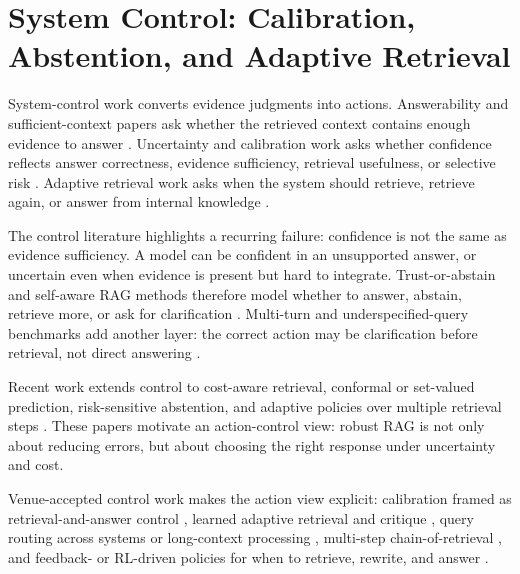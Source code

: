 \section{System Control: Calibration, Abstention, and Adaptive Retrieval}

System-control work converts evidence judgments into actions. Answerability and sufficient-context papers ask whether the retrieved context contains enough evidence to answer \citep{sufficientContext2024,rrag111,rrag141,rrag193}. Uncertainty and calibration work asks whether confidence reflects answer correctness, evidence sufficiency, retrieval usefulness, or selective risk \citep{calibRAG2025,uncertaintyRAG2024,rrag001,rrag007,rrag012,rrag093}. Adaptive retrieval work asks when the system should retrieve, retrieve again, or answer from internal knowledge \citep{selfRAG2023,whenToRetrieve2024,crag2024,ctrla2025,rrag034}.

The control literature highlights a recurring failure: confidence is not the same as evidence sufficiency. A model can be confident in an unsupported answer, or uncertain even when evidence is present but hard to integrate. Trust-or-abstain and self-aware RAG methods therefore model whether to answer, abstain, retrieve more, or ask for clarification \citep{rrag002,rrag006,rrag041,rrag064,rrag066,rrag074,rrag075,rrag087,rrag095,rrag105,rrag108}. Multi-turn and underspecified-query benchmarks add another layer: the correct action may be clarification before retrieval, not direct answering \citep{rrag141,rrag146,rrag153}.

Recent work extends control to cost-aware retrieval, conformal or set-valued prediction, risk-sensitive abstention, and adaptive policies over multiple retrieval steps \citep{rrag159,rrag164,rrag167,rrag169,rrag173,rrag178,rrag186,rrag191,rrag192,rrag198,rrag205,rrag228}. These papers motivate an action-control view: robust RAG is not only about reducing errors, but about choosing the right response under uncertainty and cost.

Venue-accepted control work makes the action view explicit: calibration framed as retrieval-and-answer control \citep{calibRAG2025}, learned adaptive retrieval and critique \citep{selfRAG2023}, query routing across systems or long-context processing \citep{rrag039,venueAcc028,venueAcc030}, multi-step chain-of-retrieval \citep{venueAcc010,venueExtra001}, and feedback- or RL-driven policies for when to retrieve, rewrite, and answer \citep{venueExtra010,venueExtra011,venueExtra016,venueExtra006}.

